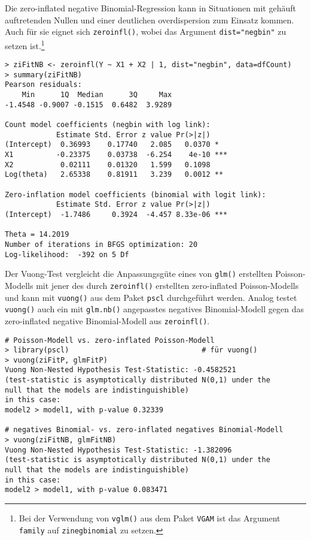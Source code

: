 Die zero-inflated negative Binomial-Regression kann in Situationen mit gehäuft auftretenden Nullen und einer deutlichen overdispersion zum Einsatz kommen. Auch für sie eignet sich \lstinline!zeroinfl()!, wobei das Argument \lstinline!dist="negbin"! zu setzen ist.\footnote{Bei der Verwendung von \lstinline!vglm()! aus dem Paket \lstinline!VGAM! ist das Argument \lstinline!family! auf \lstinline!zinegbinomial! zu setzen.}
\begin{lstlisting}
> ziFitNB <- zeroinfl(Y ~ X1 + X2 | 1, dist="negbin", data=dfCount)
> summary(ziFitNB)
Pearson residuals:
    Min      1Q  Median      3Q     Max
-1.4548 -0.9007 -0.1515  0.6482  3.9289

Count model coefficients (negbin with log link):
            Estimate Std. Error z value Pr(>|z|)
(Intercept)  0.36993    0.17740   2.085   0.0370 *
X1          -0.23375    0.03738  -6.254    4e-10 ***
X2           0.02111    0.01320   1.599   0.1098
Log(theta)   2.65338    0.81911   3.239   0.0012 **

Zero-inflation model coefficients (binomial with logit link):
            Estimate Std. Error z value Pr(>|z|)
(Intercept)  -1.7486     0.3924  -4.457 8.33e-06 ***

Theta = 14.2019
Number of iterations in BFGS optimization: 20
Log-likelihood:  -392 on 5 Df
\end{lstlisting}

Der Vuong-Test vergleicht die Anpassungsgüte eines von \lstinline!glm()! erstellten Poisson-Modells mit jener des durch \lstinline!zeroinfl()! erstellten zero-inflated Poisson-Modells und kann mit \lstinline!vuong()! aus dem Paket \lstinline!pscl! durchgeführt werden. Analog testet \lstinline!vuong()! auch ein mit \lstinline!glm.nb()! angepasstes negatives Binomial-Modell gegen das zero-inflated negative Binomial-Modell aus \lstinline!zeroinfl()!.
\begin{lstlisting}
# Poisson-Modell vs. zero-inflated Poisson-Modell
> library(pscl)                               # für vuong()
> vuong(ziFitP, glmFitP)
Vuong Non-Nested Hypothesis Test-Statistic: -0.4582521
(test-statistic is asymptotically distributed N(0,1) under the
null that the models are indistinguishible)
in this case:
model2 > model1, with p-value 0.32339

# negatives Binomial- vs. zero-inflated negatives Binomial-Modell
> vuong(ziFitNB, glmFitNB)
Vuong Non-Nested Hypothesis Test-Statistic: -1.382096
(test-statistic is asymptotically distributed N(0,1) under the
null that the models are indistinguishible)
in this case:
model2 > model1, with p-value 0.083471
\end{lstlisting}

